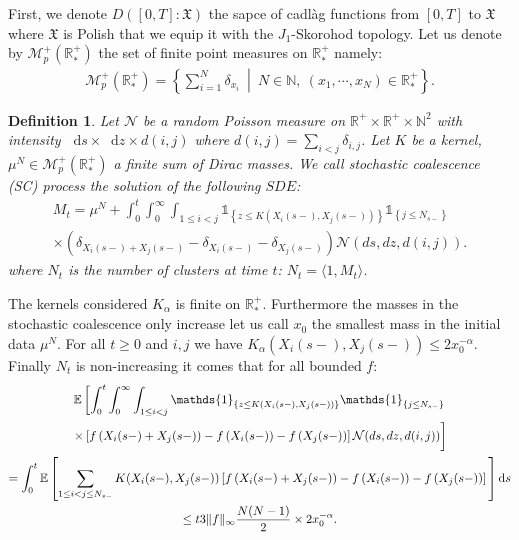 \documentclass[11pt,a4paper]{article}
\newcommand{\RR}{\mathbb{R}}
\newcommand{\NN}{\mathbb{N}}
\newcommand{\RRP}{\mathbb{R}^+_*}
\newcommand{\MC}{\mathcal{M}}
\newcommand{\NC}{\mathcal{N}}
\newcommand{\XF}{\mathfrak{X}}
\newcommand{\SC}{{\emph{SC}}}
\newcommand{\indic}[1]{\mathds{1}_{\left\lbrace#1\right\rbrace}}
\newcommand{\dd}{\mathop{}\!\mathrm{d}}
\newtheorem{definition}[theorem]{Definition}
\begin{document}
First, we denote $D\left([0,T]: \XF\right)$ the sapce of cadlàg functions from $[0,T]$ to $\XF$ where $\XF$ is Polish that we equip it with the $J_1$-Skorohod topology. Let us denote by $\MC_p^+(\RRP)$ the set of finite point measures on $\RRP$ namely:
\begin{align*}
    \MC_p^+(\RRP) = \left\lbrace \sum\limits_{i = 1}^N \delta_{x_i}\  \middle|\  N\in \NN,\  (x_1,\cdots,x_N) \in \RRP \right\rbrace. 
\end{align*}
\begin{definition}
    Let $\NC$ be a random Poisson measure on $\RR^+ \times \RR^+ \times \NN^2$ with intensity $\dd s \times \dd z \times d(i,j)$ where $d(i,j) = \sum\limits_{i < j} \delta_{i,j}$. Let $K$ be a kernel, $\mu^N \in \MC_p^+(\RRP)$ a finite sum of Dirac masses. We call stochastic coalescence (\SC) process the solution of the following $SDE$:
    \begin{multline*}
        M_t = \mu^N + \int_0^t \int_0^\infty \int_{1 \leq i <j }  \indic{z \leq K(X_{i}(s-),X_{j}(s-))} \indic{j \leq N_{s-}} \\ \times \left(\delta_{X_{i}(s-) + X_{j}(s-)} - \delta_{X_{i}(s-)} - \delta_{X_{j}(s-)}\right)\mathcal{N}(ds,dz,d(i,j)).
    \end{multline*}
    where $N_t$ is the number of clusters at time $t$: $N_t = \langle 1 , M_t\rangle$.
\end{definition}
The kernels considered $K_\alpha$ is finite on $\RRP$. Furthermore the masses in the stochastic coalescence only increase let us call $x_0$ the smallest mass in the initial data $\mu^N$. For all $t \geq 0$ and $i,j$ we have $K_\alpha(X_{i}(s-),X_{j}(s-)) \leq 2x_0^{-\alpha}$. Finally $N_t$ is non-increasing it comes that for all bounded $f$:
\begin{multline*}
    \mathbb{E} \left[ \int_0^t \int_0^\infty \int_{1 \leq i <j }  \indic{z \leq K(X_{i}(s-),X_{j}(s-))} \indic{j \leq N_{s-}}\right. \\
    \left. \times   \left[f\left(X_{i}(s-) + X_{j}(s-)\right) - f\left(X_{i}(s-)\right) - f\left( X_{j}(s-)\right)\right]\mathcal{N}(ds,dz,d(i,j)) \vphantom{\int_0^t \int_0^\infty \int_{i <j } }\right] \\
    = \int_0^t \mathbb{E} \left[\sum\limits_{1 \leq i< j \leq N_{s-}} K(X_{i}(s-),X_{j}(s-)) \left[f\left(X_{i}(s-) + X_{j}(s-)\right) - f\left(X_{i}(s-)\right) - f\left( X_{j}(s-)\right)\right] \vphantom{\int_0^t \int_0^\infty \int_{i <j } } \right] \dd s \\
    \leq t 3\|f\|_{\infty}\dfrac{N(N-1)}{2} \times 2 x_0^{-\alpha} .
\end{multline*}
\end{document}
